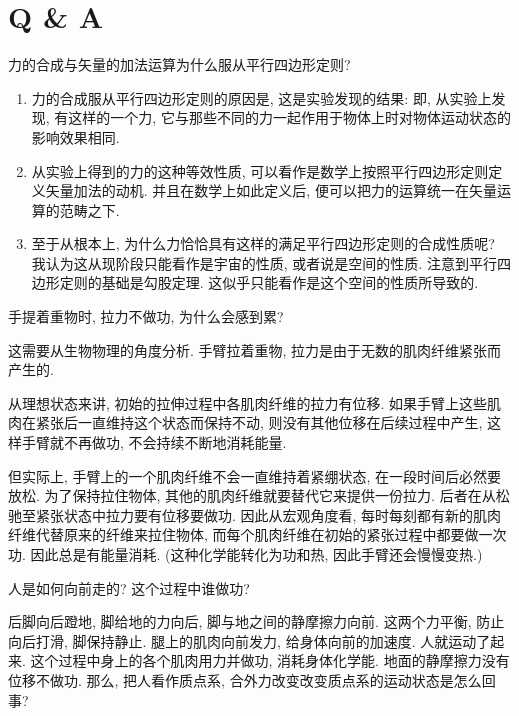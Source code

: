\documentclass{article}
\begin{document}
\part{Q \& A}
\begin{question}
  力的合成与矢量的加法运算为什么服从平行四边形定则?
\end{question}
\begin{answer}
  \begin{enumerate}
    \item 力的合成服从平行四边形定则的原因是, 这是实验发现的结果: 即, 从实验上发现, 有这样的一个力, 它与那些不同的力一起作用于物体上时对物体运动状态的影响效果相同.
    \item 从实验上得到的力的这种等效性质, 可以看作是数学上按照平行四边形定则定义矢量加法的动机. 并且在数学上如此定义后, 便可以把力的运算统一在矢量运算的范畴之下.
    \item 至于从根本上, 为什么力恰恰具有这样的满足平行四边形定则的合成性质呢? 我认为这从现阶段只能看作是宇宙的性质, 或者说是空间的性质. 注意到平行四边形定则的基础是勾股定理. 这似乎只能看作是这个空间的性质所导致的.
  \end{enumerate}
\end{answer}

\begin{question}
  手提着重物时, 拉力不做功, 为什么会感到累?
\end{question}
\begin{answer}
  这需要从生物物理的角度分析. 手臂拉着重物, 拉力是由于无数的肌肉纤维紧张而产生的.
  
  从理想状态来讲, 初始的拉伸过程中各肌肉纤维的拉力有位移.  如果手臂上这些肌肉在紧张后一直维持这个状态而保持不动, 则没有其他位移在后续过程中产生, 这样手臂就不再做功, 不会持续不断地消耗能量.

  但实际上, 手臂上的一个肌肉纤维不会一直维持着紧绷状态, 在一段时间后必然要放松. 为了保持拉住物体, 其他的肌肉纤维就要替代它来提供一份拉力. 后者在从松驰至紧张状态中拉力要有位移要做功. 因此从宏观角度看, 每时每刻都有新的肌肉纤维代替原来的纤维来拉住物体, 而每个肌肉纤维在初始的紧张过程中都要做一次功. 因此总是有能量消耗. (这种化学能转化为功和热, 因此手臂还会慢慢变热.)
\end{answer}

\begin{question}
  人是如何向前走的? 这个过程中谁做功? 
\end{question}
\begin{answer}
  后脚向后蹬地, 脚给地的力向后, 脚与地之间的静摩擦力向前. 这两个力平衡, 防止向后打滑, 脚保持静止. 腿上的肌肉向前发力, 给身体向前的加速度. 人就运动了起来. 这个过程中身上的各个肌肉用力并做功, 消耗身体化学能. 地面的静摩擦力没有位移不做功.
  那么, 把人看作质点系, 合外力改变改变质点系的运动状态是怎么回事?
\end{answer}
\end{document}

